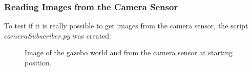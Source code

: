 \documentclass[12pt,oneside]{article}
\begin{document}
\subsubsection{Reading Images from the Camera Sensor}
To test if it is really possible to get images from the camera sensor, the script $cameraSubscriber.py$ was created. 
\begin{figure}[H]
  \centering
  \hfill
  \caption{Image of the gazebo world and from the camera sensor at starting position.}
\end{figure}
\end{document}
